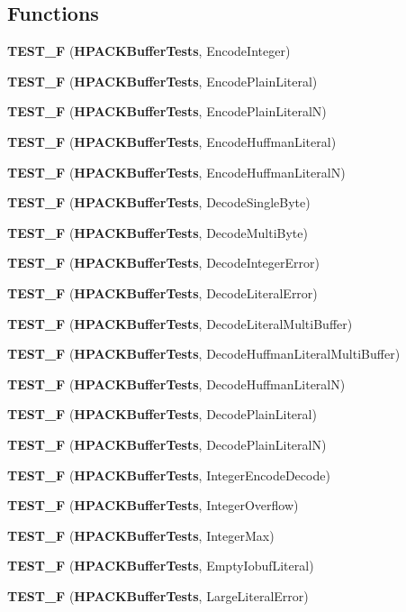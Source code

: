 \subsection*{Functions}
\begin{DoxyCompactItemize}
\item 
{\bf T\+E\+S\+T\+\_\+F} ({\bf H\+P\+A\+C\+K\+Buffer\+Tests}, Encode\+Integer)
\item 
{\bf T\+E\+S\+T\+\_\+F} ({\bf H\+P\+A\+C\+K\+Buffer\+Tests}, Encode\+Plain\+Literal)
\item 
{\bf T\+E\+S\+T\+\_\+F} ({\bf H\+P\+A\+C\+K\+Buffer\+Tests}, Encode\+Plain\+LiteralN)
\item 
{\bf T\+E\+S\+T\+\_\+F} ({\bf H\+P\+A\+C\+K\+Buffer\+Tests}, Encode\+Huffman\+Literal)
\item 
{\bf T\+E\+S\+T\+\_\+F} ({\bf H\+P\+A\+C\+K\+Buffer\+Tests}, Encode\+Huffman\+LiteralN)
\item 
{\bf T\+E\+S\+T\+\_\+F} ({\bf H\+P\+A\+C\+K\+Buffer\+Tests}, Decode\+Single\+Byte)
\item 
{\bf T\+E\+S\+T\+\_\+F} ({\bf H\+P\+A\+C\+K\+Buffer\+Tests}, Decode\+Multi\+Byte)
\item 
{\bf T\+E\+S\+T\+\_\+F} ({\bf H\+P\+A\+C\+K\+Buffer\+Tests}, Decode\+Integer\+Error)
\item 
{\bf T\+E\+S\+T\+\_\+F} ({\bf H\+P\+A\+C\+K\+Buffer\+Tests}, Decode\+Literal\+Error)
\item 
{\bf T\+E\+S\+T\+\_\+F} ({\bf H\+P\+A\+C\+K\+Buffer\+Tests}, Decode\+Literal\+Multi\+Buffer)
\item 
{\bf T\+E\+S\+T\+\_\+F} ({\bf H\+P\+A\+C\+K\+Buffer\+Tests}, Decode\+Huffman\+Literal\+Multi\+Buffer)
\item 
{\bf T\+E\+S\+T\+\_\+F} ({\bf H\+P\+A\+C\+K\+Buffer\+Tests}, Decode\+Huffman\+LiteralN)
\item 
{\bf T\+E\+S\+T\+\_\+F} ({\bf H\+P\+A\+C\+K\+Buffer\+Tests}, Decode\+Plain\+Literal)
\item 
{\bf T\+E\+S\+T\+\_\+F} ({\bf H\+P\+A\+C\+K\+Buffer\+Tests}, Decode\+Plain\+LiteralN)
\item 
{\bf T\+E\+S\+T\+\_\+F} ({\bf H\+P\+A\+C\+K\+Buffer\+Tests}, Integer\+Encode\+Decode)
\item 
{\bf T\+E\+S\+T\+\_\+F} ({\bf H\+P\+A\+C\+K\+Buffer\+Tests}, Integer\+Overflow)
\item 
{\bf T\+E\+S\+T\+\_\+F} ({\bf H\+P\+A\+C\+K\+Buffer\+Tests}, Integer\+Max)
\item 
{\bf T\+E\+S\+T\+\_\+F} ({\bf H\+P\+A\+C\+K\+Buffer\+Tests}, Empty\+Iobuf\+Literal)
\item 
{\bf T\+E\+S\+T\+\_\+F} ({\bf H\+P\+A\+C\+K\+Buffer\+Tests}, Large\+Literal\+Error)
\end{DoxyCompactItemize}


